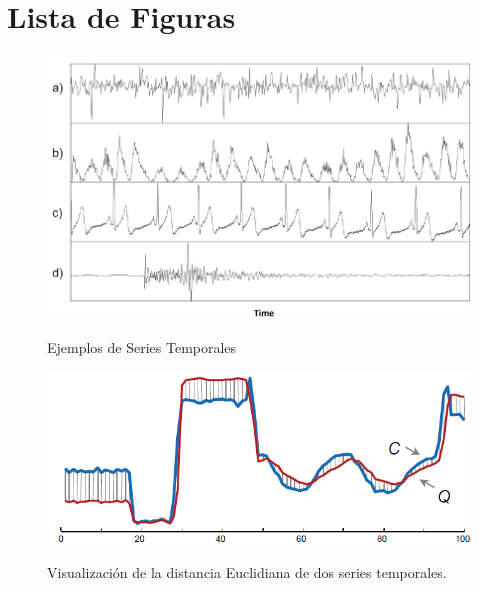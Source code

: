 \section{Lista de Figuras}
\begin{figure}[h]
\vspace{0.1in}
\begin{center}
\includegraphics[scale=0.6]{timeSeries.png}\\%
\end{center}
\caption{Ejemplos de Series Temporales}
\label{arm:fig1}
\end{figure}
\begin{figure}[h]
\vspace{0.1in}
\begin{center}
\includegraphics[scale=0.6]{euclidean.png}\\
\end{center}
\caption{Visualizaci\'on de la distancia Euclidiana de dos series temporales.}
\label{arm:fig2}
\end{figure}
